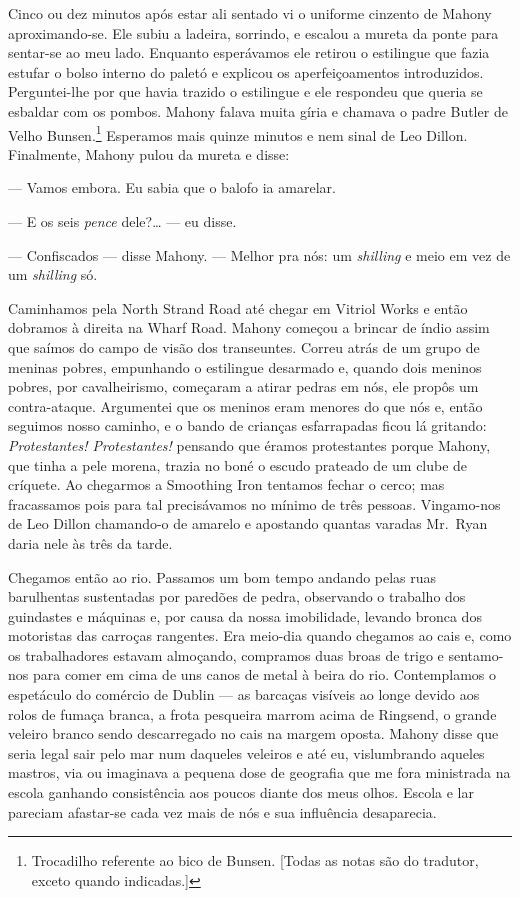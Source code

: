 Cinco ou dez minutos após estar ali sentado vi o uniforme cinzento de Mahony
aproximando-se.  Ele subiu a ladeira, sorrindo, e escalou a mureta da ponte
para sentar-se ao meu lado.  Enquanto esperávamos ele retirou o estilingue que
fazia estufar o bolso interno do paletó e explicou os aperfeiçoamentos
introduzidos.  Perguntei-lhe por que havia trazido o estilingue e ele respondeu
que queria se esbaldar com os pombos.  Mahony falava muita gíria e chamava o
padre Butler de Velho Bunsen.\footnote{ Trocadilho referente ao
bico de Bunsen. [Todas as notas são do tradutor, exceto quando indicadas.]}  
Esperamos mais quinze minutos e nem sinal de Leo
Dillon.  Finalmente, Mahony pulou da mureta e disse:

--- Vamos embora.  Eu sabia que o balofo ia amarelar.

--- E os seis \textit{pence} dele?\ldots{} --- eu disse.

--- Confiscados --- disse Mahony.  --- Melhor pra nós: um \textit{shilling} e
meio em vez de um \textit{shilling} só.

Caminhamos pela North Strand Road até chegar em Vitriol Works e então dobramos
à direita na Wharf Road.  Mahony começou a brincar de índio assim que saímos do
campo de visão dos transeuntes.  Correu atrás de um grupo de meninas pobres,
empunhando o estilingue desarmado e, quando dois meninos pobres, por
cavalheirismo, começaram a atirar pedras em nós, ele propôs um contra-ataque.
Argumentei que os meninos eram menores do que nós e, então seguimos nosso
caminho, e o bando de crianças esfarrapadas ficou lá gritando:
\textit{Protestantes! Protestantes!} pensando que éramos protestantes porque
Mahony, que tinha a pele morena, trazia no boné o escudo prateado de um clube
de críquete.  Ao chegarmos a Smoothing Iron tentamos fechar o cerco; mas
fracassamos pois para tal precisávamos no mínimo de três pessoas.  Vingamo-nos
de Leo Dillon chamando-o de amarelo e apostando quantas varadas Mr.~Ryan daria
nele às três da tarde.

Chegamos então ao rio.  Passamos um bom tempo andando pelas ruas barulhentas
sustentadas por paredões de pedra, observando o trabalho dos guindastes e
máquinas e, por causa da nossa imobilidade, levando bronca dos motoristas das
carroças rangentes.  Era meio-dia quando chegamos ao cais e, como os
trabalhadores estavam almoçando, compramos duas broas de trigo e sentamo-nos
para comer em cima de uns canos de metal à beira do rio.  Contemplamos o
espetáculo do comércio de Dublin --- as barcaças visíveis ao longe devido aos
rolos de fumaça branca, a frota pesqueira marrom acima de Ringsend, o grande
veleiro branco sendo descarregado no cais na margem oposta.  Mahony disse que
seria legal sair pelo mar num daqueles veleiros e até eu, vislumbrando aqueles
mastros, via ou imaginava a pequena dose de geografia que me fora ministrada na
escola ganhando consistência aos poucos diante dos meus olhos.  Escola e lar
pareciam afastar-se cada vez mais de nós e sua influência desaparecia.

